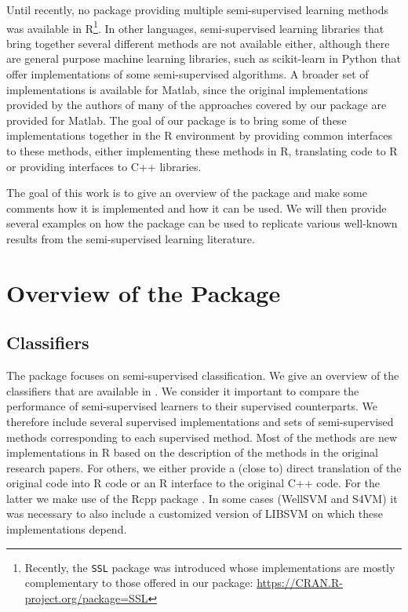\documentclass[runningheads,a4paper]{llncs}\usepackage[]{graphicx}\usepackage[]{color}
\begin{document}
Until recently, no package providing multiple semi-supervised learning methods was available in R\footnote{Recently, the \texttt{SSL} package was introduced whose implementations are mostly complementary to those offered in our package: \url{https://CRAN.R-project.org/package=SSL}}. In other languages, semi-supervised learning libraries that bring together several different methods are not available either, although there are general purpose machine learning libraries, such as scikit-learn in Python \cite{scikit-learn} that offer implementations of some semi-supervised algorithms. A broader set of implementations is available for Matlab, since the original implementations provided by the authors of many of the approaches covered by our package are provided for Matlab. The goal of our package is to bring some of these implementations together in the R environment by providing common interfaces to these methods, either implementing these methods in R, translating code to R or providing interfaces to C++ libraries.

The goal of this work is to give an overview of the package and make some comments how it is implemented and how it can be used. We will then provide several examples on how the package can be used to replicate various well-known results from the semi-supervised learning literature.

\section{Overview of the Package}

\subsection{Classifiers}
The package focuses on semi-supervised classification. We give an overview of the classifiers that are available in . We consider it important to compare the performance of semi-supervised learners to their supervised counterparts. We therefore include several supervised implementations and sets of semi-supervised methods corresponding to each supervised method. Most of the methods are new implementations in R based on the description of the methods in the original research papers. For others, we either provide a (close to) direct translation of the original code into R code or an R interface to the original C++ code. For the latter we make use of the Rcpp package \cite{Eddelbuettel2011}. In some cases (WellSVM and S4VM) it was necessary to also include a customized version of LIBSVM \cite{Chang2011} on which these implementations depend.
\end{document}

